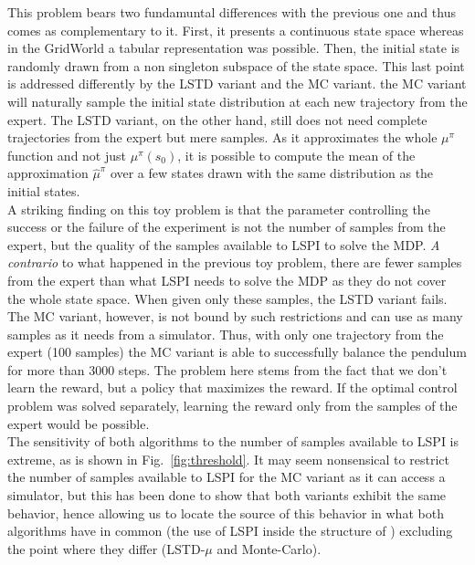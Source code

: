 \documentclass{llncs}
\begin{document}
This problem bears two fundamuntal differences with the previous one and thus comes as complementary to it. First, it presents a continuous state space whereas in the GridWorld a tabular representation was possible. Then, the initial state is randomly drawn from a non singleton subspace of the state space. This last point is addressed differently by the LSTD variant and the MC variant. the MC variant will naturally sample the initial state distribution at each new trajectory from the expert. The LSTD variant, on the other hand, still does not need complete trajectories from the expert but mere samples. As it approximates the whole $\mu^{\pi}$ function and not just $\mu^\pi(s_0)$, it is possible to compute the mean of the approximation $\hat\mu^\pi$ over a few states drawn with the same distribution as the initial states.\\

A striking finding on this toy problem is that the parameter controlling the success or the failure of the experiment is not the number of samples from the expert, but the quality of the samples available to LSPI to solve the MDP. \emph{A contrario} to what happened in the previous toy problem, there are fewer samples from the expert than what LSPI needs to solve the MDP as they do not cover the whole state space. When given only these samples, the LSTD variant fails. The MC variant, however, is not bound by such restrictions and can use as many samples as it needs from a simulator. Thus, with only one trajectory from the expert (100 samples) the MC variant is able to successfully balance the pendulum for more than 3000 steps. The problem here stems from the fact that we don't learn the reward, but a policy that maximizes the reward. If the optimal control problem was solved separately, learning the reward only from the samples of the expert would be possible.\\

The sensitivity of both algorithms to the number of samples available to LSPI is extreme, as is shown in Fig.~\ref{fig:threshold}. It may seem nonsensical to restrict the number of samples available to LSPI for the MC variant as it can access a simulator, but this has been done to show that both variants exhibit the same behavior, hence allowing us to locate the source of this behavior in what both algorithms have in common (the use of LSPI inside the structure of \citep{abbeel2004apprenticeship}) excluding the point where they differ (LSTD-$\mu$ and Monte-Carlo).\\
\end{document}

